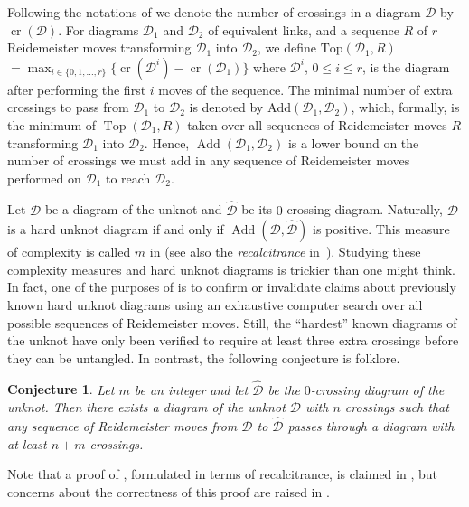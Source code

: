 \documentclass[10pt,a4paper]{amsart}
\newcommand{\cross}{\operatorname{cr}}
\newcommand{\addcross}{\operatorname{Top}}
\newcommand{\add}{\operatorname{Add}}
\newtheorem{conjecture}[theorem]{Conjecture}
\begin{document}
Following the notations of \cite{Mesmay_hard_unknot, Kauffman_untangling} we denote the number of crossings in a diagram $\mathcal{D}$ by $\cross(\mathcal{D})$. For diagrams $\mathcal{D}_1$ and $\mathcal{D}_2$ of equivalent links, and a sequence $R$ of $r$ Reidemeister moves transforming $\mathcal{D}_1$ into $\mathcal{D}_2$, we define \textbf{$\text{Top}(\mathcal{D}_1,R)$}$ = \max_{i\in \{0, 1, \ldots , r\}} \{\cross(\mathcal{D}^i) - \cross(\mathcal{D}_1)\}$ where $\mathcal{D}^i$, $0\leq i \leq r$, is the diagram after performing the first $i$ moves of the sequence. The minimal number of extra crossings to pass from $\mathcal{D}_1$ to $\mathcal{D}_2$ is denoted by \textbf{$\text{Add}(\mathcal{D}_1,\mathcal{D}_2)$}, which, formally, is the minimum of $\addcross(\mathcal{D}_1,R)$ taken over all sequences of Reidemeister moves $R$ transforming $\mathcal{D}_1$ into $\mathcal{D}_2$. Hence, $\add(\mathcal{D}_1,\mathcal{D}_2)$ is a lower bound on the number of crossings we must add in any sequence of Reidemeister moves performed on $\mathcal{D}_1$ to reach $\mathcal{D}_2$. 

Let $\mathcal{D}$ be a diagram of the unknot and $\hat{\mathcal{D}}$ be its $0$-crossing diagram. Naturally, $\mathcal{D}$ is a hard unknot diagram if and only if $\add(\mathcal{D},\hat{\mathcal{D}})$ is positive. This measure of complexity is called $m$ in \cite{Mesmay_hard_unknot} (see also the \emph{recalcitrance} in~\cite{Kauffman_untangling}). Studying these complexity measures and hard unknot diagrams is trickier than one might think. In fact, one of the purposes of \cite{Mesmay_hard_unknot} is to confirm or invalidate claims about previously known hard unknot diagrams using an exhaustive computer search over all possible sequences of Reidemeister moves. Still, the ``hardest'' known diagrams of the unknot have only been verified to require at least three extra crossings before they can be untangled. In contrast, the following conjecture is folklore.

\begin{conjecture}
  \label{conjm}
  Let $m$ be an integer and let $\hat{\mathcal{D}}$ be the $0$-crossing diagram of the unknot. Then there exists a diagram of the unknot $\mathcal{D}$ with $n$ crossings such that any sequence of Reidemeister moves from $\mathcal{D}$ to $\hat{\mathcal{D}}$ passes through a diagram with at least $n+m$ crossings.
\end{conjecture}

Note that a proof of , formulated in terms of recalcitrance, is claimed in \cite{Kauffman_untangling}, but concerns about the correctness of this proof are raised in \cite{Mesmay_hard_unknot}.
\end{document}
